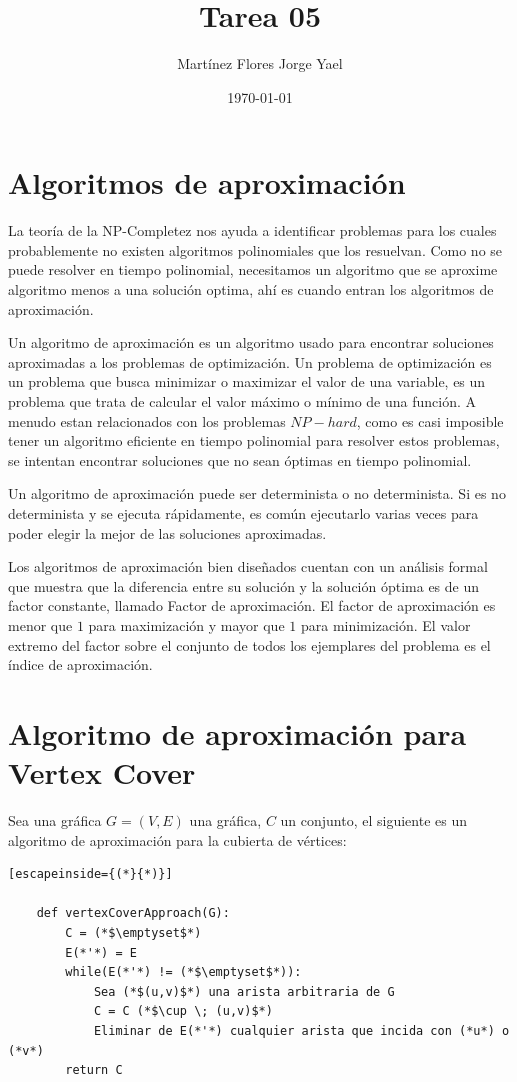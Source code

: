 \documentclass[letterpaper,12pt]{article}
\begin{document}
\lstset{language=Python}   

\title{Tarea 05}
\author{Martínez Flores Jorge Yael}
\date{\today}
\maketitle

\section{Algoritmos de aproximación}

La teoría de la NP-Completez nos ayuda a identificar problemas para los cuales
probablemente no existen algoritmos polinomiales que los resuelvan. Como no se
puede resolver en tiempo polinomial, necesitamos un algoritmo que se aproxime 
algoritmo menos a una solución optima, ahí es cuando entran los algoritmos 
de aproximación.

Un algoritmo de aproximación es un algoritmo usado para encontrar soluciones
aproximadas a los problemas de optimización. Un problema de optimización es un
problema que busca minimizar o maximizar el valor de una variable, es un 
problema que trata de calcular el valor máximo o mínimo de una función. A menudo
estan relacionados con los problemas $NP-hard$, como es casi imposible tener un
algoritmo eficiente en tiempo polinomial para resolver estos problemas, 
se intentan encontrar soluciones que no sean óptimas en tiempo polinomial.

Un algoritmo de aproximación puede ser determinista o no determinista. Si es 
no determinista y se ejecuta rápidamente, es común ejecutarlo varias veces para
poder elegir la mejor de las soluciones aproximadas. 

Los algoritmos de aproximación bien diseñados cuentan con un análisis formal que 
muestra que la diferencia entre su solución y la solución óptima es de un factor
constante, llamado Factor de aproximación. El factor de aproximación es menor 
que $1$ para maximización y mayor que $1$ para minimización. El valor extremo 
del factor sobre el conjunto de todos los ejemplares del problema es el índice 
de aproximación.

\section{Algoritmo de aproximación para Vertex Cover}

Sea una gráfica $G=(V,E)$ una gráfica, $C$ un conjunto, el siguiente es un algoritmo
de aproximación para la cubierta de vértices:
\begin{lstlisting}[escapeinside={(*}{*)}]

    def vertexCoverApproach(G):
        C = (*$\emptyset$*)
        E(*'*) = E
        while(E(*'*) != (*$\emptyset$*)):
            Sea (*$(u,v)$*) una arista arbitraria de G
            C = C (*$\cup \; (u,v)$*)
            Eliminar de E(*'*) cualquier arista que incida con (*u*) o (*v*)
        return C

\end{lstlisting}
\end{document}
